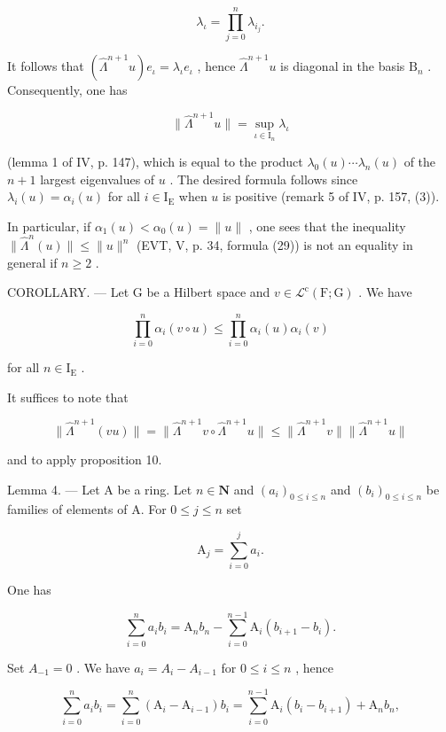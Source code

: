 \[
\lambda_ {\iota} = \prod_ {j = 0} ^ {n} \lambda_ {i _ {j}}.
\]

It follows that \((\hat{\Lambda}^{n + 1}u)e_{\iota} = \lambda_{\iota}e_{\iota}\) , hence \(\hat{\Lambda}^{n + 1}u\) is diagonal in the basis \(\mathrm{B}_n\) . Consequently, one has

\[
\| \widehat {\Lambda} ^ {n + 1} u \| = \sup _ {\iota \in \mathrm{I} _ {n}} \lambda_ {\iota}
\]

(lemma 1 of IV, p. 147), which is equal to the product \(\lambda_{0}(u)\cdots\lambda_{n}(u)\) of the \(n+1\) largest eigenvalues of \(u\) . The desired formula follows since \(\lambda_{i}(u)=\alpha_{i}(u)\) for all \(i\in\mathrm{I}_{\mathrm{E}}\) when \(u\) is positive (remark 5 of IV, p. 157, (3)).

In particular, if \(\alpha_{1}(u) < \alpha_{0}(u) = \| u\|\) , one sees that the inequality \(\| \widehat{\Lambda}^{n}(u)\| \leqslant \| u\|^{n}\) (EVT, V, p. 34, formula (29)) is not an equality in general if \(n \geqslant 2\) .

COROLLARY. --- Let G be a Hilbert space and \(v \in \mathcal{L}^{\mathrm{c}}(\mathrm{F};\mathrm{G})\) . We have

\[
\prod_ {i = 0} ^ {n} \alpha_ {i} (v \circ u) \leqslant \prod_ {i = 0} ^ {n} \alpha_ {i} (u) \alpha_ {i} (v)
\]

for all \(n \in \mathrm{I}_{\mathrm{E}}\) .

It suffices to note that

\[
\| \widehat {\Lambda} ^ {n + 1} (v u) \| = \| \widehat {\Lambda} ^ {n + 1} v \circ \widehat {\Lambda} ^ {n + 1} u \| \leqslant \| \widehat {\Lambda} ^ {n + 1} v \| \| \widehat {\Lambda} ^ {n + 1} u \|
\]

and to apply proposition 10.

Lemma 4. --- Let A be a ring. Let \(n \in \mathbf{N}\) and \((a_i)_{0 \leqslant i \leqslant n}\) and \((b_i)_{0 \leqslant i \leqslant n}\) be families of elements of A. For \(0 \leqslant j \leqslant n\) set

\[
\mathrm{A} _ {j} = \sum_ {i = 0} ^ {j} a _ {i}.
\]

One has

\[
\sum_ {i = 0} ^ {n} a _ {i} b _ {i} = \mathrm{A} _ {n} b _ {n} - \sum_ {i = 0} ^ {n - 1} \mathrm{A} _ {i} (b _ {i + 1} - b _ {i}).
\]

Set \(A_{-1}=0\) . We have \(a_{i}=A_{i}-A_{i-1}\) for \(0\leqslant i\leqslant n\) , hence

\[
\sum_ {i = 0} ^ {n} a _ {i} b _ {i} = \sum_ {i = 0} ^ {n} (\mathrm{A} _ {i} - \mathrm{A} _ {i - 1}) b _ {i} = \sum_ {i = 0} ^ {n - 1} \mathrm{A} _ {i} (b _ {i} - b _ {i + 1}) + \mathrm{A} _ {n} b _ {n},
\]

